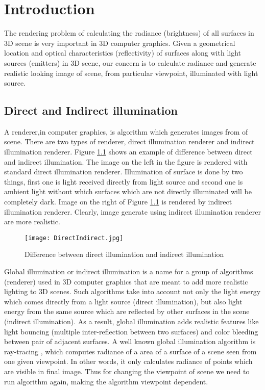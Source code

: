 \chapter{\label{Intro}Introduction}

The rendering problem of calculating the radiance  (brightness) of all surfaces in 3D scene is very important in 3D computer graphics. Given a geometrical location and optical characteristics  (reflectivity) of surfaces along with light sources (emitters) in 3D scene, our concern is to calculate radiance and generate realistic looking image of scene, from particular viewpoint, illuminated with light source.

\section{Direct and Indirect illumination}
A renderer,in computer graphics, is algorithm which generates images from of scene. There are two types of renderer, direct illumination renderer and indirect illumination renderer. 
Figure \ref{fig:directindirect} shows an example of difference between direct and indirect illumination. The image on the left in the figure is rendered with standard direct illumination renderer. Illumination of surface is done by two things, first one is light received directly from light source and second one is ambient light without which surfaces which are not directly illuminated will be completely dark. Image on the right of Figure \ref{fig:directindirect} is rendered by indirect illumination renderer. Clearly, image generate using indirect illumination renderer are more realistic.
\begin{figure}[tbh]
\centering{}
\captionsetup{justification=centering}
\texttt{[image: DirectIndirect.jpg]}
\caption{\label{fig:directindirect}Difference between direct illumination and indirect illumination \cite{wikiradiosity}}
\end{figure}

Global illumination or indirect illumination is a name for a group of algorithms  (renderer) used in 3D computer graphics that are meant to add more realistic lighting to 3D scenes. Such algorithms take into account not only the light energy which comes directly from a light source  (direct illumination), but also light energy from the same source which are reflected by other surfaces in the scene  (indirect illumination). As a result, global illumination adds realistic features like light bouncing  (multiple inter-reflection between two surfaces) and color bleeding between pair of adjacent surfaces. A well known global illumination algorithm is ray-tracing \cite{Whitted}, which computes  radiance of a area of a surface of a scene seen from one given viewpoint. In other words, it only calculates radiance of points which are visible in final image. Thus for changing the viewpoint of scene we need to run algorithm again, making the algorithm viewpoint dependent.

